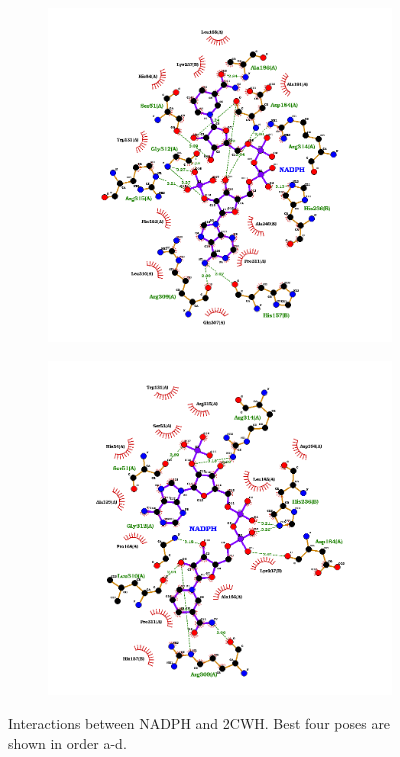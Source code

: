 \documentclass[12pt]{article}
\begin{document}
\begin{figure}
\begin{subfigure}[h!]{0.47\textwidth}
			\caption{}
		\end{subfigure}
		\hfill
		\begin{subfigure}[h!]{0.47\textwidth}
			\includegraphics[width=\textwidth]{../10/Dock/best3.png}
			\caption{}
		\end{subfigure}
		\hfill
		\begin{subfigure}[h!]{0.47\textwidth}
			\includegraphics[width=\textwidth]{../10/Dock/best4.png}
			\caption{}
		\end{subfigure}
		\hfill
		\caption[Interactions between NADPH and 2CWH]{\centering Interactions between NADPH and 2CWH. Best four poses are shown in order a-d.}
		\label{fig10_1}
	\end{figure}
	\FloatBarrier
	
\end{document}
